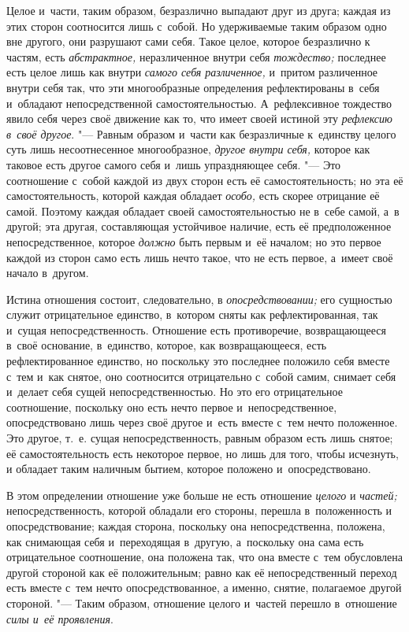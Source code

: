 Целое и~части, таким образом, безразлично выпадают друг из друга; каждая из
этих сторон соотносится лишь с~собой. Но удерживаемые таким образом одно
вне другого, они разрушают сами себя. Такое целое, которое безразлично к
частям, есть {\em абстрактное,} неразличенное внутри
себя {\em тождество;} последнее есть целое лишь как
внутри {\em самого себя различенное,} и~притом
различенное внутри себя так, что эти многообразные определения
рефлектированы в~себя и~обладают непосредственной самостоятельностью.
А~рефлексивное тождество явило себя через своё движение как то, что имеет
своей истиной эту {\em рефлексию в~своё другое}. "---
Равным образом и~части как безразличные к~единству целого суть лишь
несоотнесенное многообразное, {\em другое внутри себя,}
которое как таковое есть другое самого себя и~лишь упраздняющее себя. "--- Это
соотношение с~собой каждой из двух сторон есть её самостоятельность; но эта
её самостоятельность, которой каждая обладает
{\em особо,} есть скорее отрицание её самой. Поэтому
каждая обладает своей самостоятельностью не в~себе самой, а~в другой; эта
другая, составляющая устойчивое наличие, есть её предположенное
непосредственное, которое {\em должно} быть первым и~её
началом; но это первое каждой из сторон само есть лишь нечто такое, что не
есть первое, а~имеет своё начало в~другом.

Истина отношения состоит, следовательно, в
{\em опосредствовании;} его сущностью служит
отрицательное единство, в~котором сняты как рефлектированная, так и~сущая
непосредственность. Отношение есть противоречие, возвращающееся в~своё
основание, в~единство, которое, как возвращающееся, есть рефлектированное
единство, но поскольку это последнее положило себя вместе с~тем и~как
снятое, оно соотносится отрицательно с~собой самим, снимает себя и~делает
себя сущей непосредственностью. Но это его отрицательное соотношение,
поскольку оно есть нечто первое и~непосредственное, опосредствовано лишь
через своё другое и~есть вместе с~тем нечто положенное. Это другое, т.~е.
сущая непосредственность, равным образом есть лишь снятое; её
самостоятельность есть некоторое первое, но лишь для того, чтобы исчезнуть,
и обладает таким наличным бытием, которое положено и~опосредствовано.

В этом определении отношение уже больше не есть отношение
{\em целого} и {\em частей;}
непосредственность, которой обладали его стороны, перешла в~положенность и
опосредствование; каждая сторона, поскольку она непосредственна, положена,
как снимающая себя и~переходящая в~другую, а~поскольку она сама есть
отрицательное соотношение, она положена так, что она вместе с~тем
обусловлена другой стороной как её положительным; равно как её
непосредственный переход есть вместе с~тем нечто опосредствованное, а
именно, снятие, полагаемое другой стороной. "--- Таким образом, отношение
целого и~частей перешло в~отношение {\em силы и~её проявления}.

